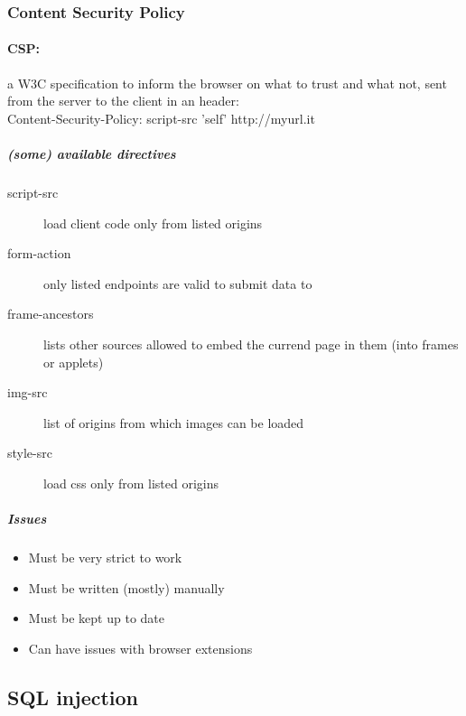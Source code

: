 \documentclass{article}
\begin{document}
\subsubsection{Content Security Policy}
\paragraph{CSP:} a W3C specification to inform the browser on what to trust and what not, sent from the server to the client in an header:\\
Content-Security-Policy: script-src 'self' http://myurl.it
\subparagraph{(some) available directives}
\begin{description}
\item[script-src] load client code only from listed origins
\item[form-action] only listed endpoints are valid to submit data to
\item[frame-ancestors] lists other sources allowed to embed the currend page in them (into frames or applets)
\item[img-src] list of origins from which images can be loaded
\item[style-src] load css only from listed origins
\end{description}
\subparagraph{Issues}
\begin{itemize}
\item Must be very strict to work
\item Must be written (mostly) manually
\item Must be kept up to date
\item Can have issues with browser extensions
\end{itemize}

\subsection{SQL injection}
\end{document}
